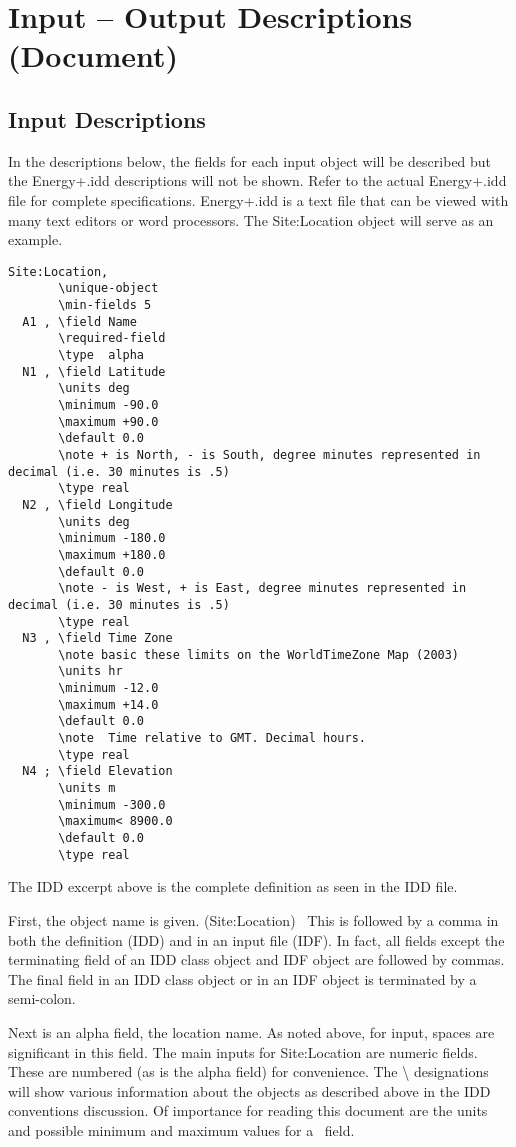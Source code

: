 \section{Input -- Output Descriptions (Document)}\label{input-output-descriptions-document}

\subsection{Input Descriptions}\label{input-descriptions}

In the descriptions below, the fields for each input object will be described but the Energy+.idd descriptions will not be shown. Refer to the actual Energy+.idd file for complete specifications. Energy+.idd is a text file that can be viewed with many text editors or word processors. The Site:Location object will serve as an example.

\begin{lstlisting}
Site:Location,
       \unique-object
       \min-fields 5
  A1 , \field Name
       \required-field
       \type  alpha
  N1 , \field Latitude
       \units deg
       \minimum -90.0
       \maximum +90.0
       \default 0.0
       \note + is North, - is South, degree minutes represented in decimal (i.e. 30 minutes is .5)
       \type real
  N2 , \field Longitude
       \units deg
       \minimum -180.0
       \maximum +180.0
       \default 0.0
       \note - is West, + is East, degree minutes represented in decimal (i.e. 30 minutes is .5)
       \type real
  N3 , \field Time Zone
       \note basic these limits on the WorldTimeZone Map (2003)
       \units hr
       \minimum -12.0
       \maximum +14.0
       \default 0.0
       \note  Time relative to GMT. Decimal hours.
       \type real
  N4 ; \field Elevation
       \units m
       \minimum -300.0
       \maximum< 8900.0
       \default 0.0
       \type real
\end{lstlisting}

The IDD excerpt above is the complete definition as seen in the IDD file.

First, the object name is given. (Site:Location)~ This is followed by a comma in both the definition (IDD) and in an input file (IDF). In fact, all fields except the terminating field of an IDD class object and IDF object are followed by commas. The final field in an IDD class object or in an IDF object is terminated by a semi-colon.

Next is an alpha field, the location name. As noted above, for input, spaces are significant in this field. The main inputs for Site:Location are numeric fields. These are numbered (as is the alpha field) for convenience. The \textbackslash{} designations will show various information about the objects as described above in the IDD conventions discussion. Of importance for reading this document are the units and possible minimum and maximum values for a~ field.

